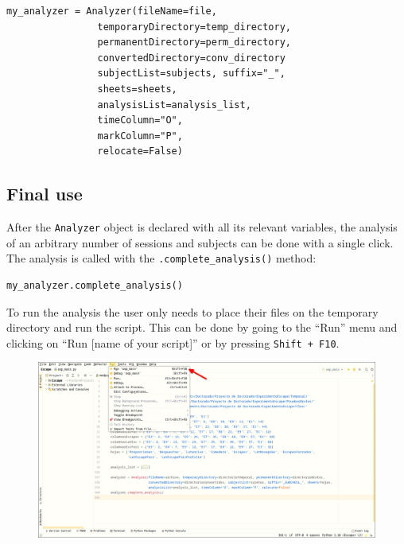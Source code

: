 \documentclass[a4paper,12pt]{article}
\begin{document}
\begin{tcolorbox}[
    enhanced,
    attach boxed title to top left={xshift=6mm,yshift=-3mm},
    colback=lightgreen!20,
    colframe=lightgreen,
    colbacktitle=lightgreen,
    title=Python,
    fonttitle=\bfseries\color{black},
    boxed title style={size=small,colframe=lightgreen,sharp corners},
    sharp corners,
    ]
    \begin{verbatim}
my_analyzer = Analyzer(fileName=file,
                temporaryDirectory=temp_directory,
                permanentDirectory=perm_directory,
                convertedDirectory=conv_directory
                subjectList=subjects, suffix="_",
                sheets=sheets,
                analysisList=analysis_list,
                timeColumn="O",
                markColumn="P",
                relocate=False)
    \end{verbatim}
\end{tcolorbox}

\subsection{Final use}

After the \verb|Analyzer| object is declared with all its relevant variables, the analysis of an arbitrary number of sessions and subjects can be done with a single click.  The analysis is called with the \verb|.complete_analysis()| method:
\begin{tcolorbox}[
    enhanced,
    attach boxed title to top left={xshift=6mm,yshift=-3mm},
    colback=lightgreen!20,
    colframe=lightgreen,
    colbacktitle=lightgreen,
    title=Python,
    fonttitle=\bfseries\color{black},
    boxed title style={size=small,colframe=lightgreen,sharp corners},
    sharp corners,
    ]
    \begin{verbatim}
my_analyzer.complete_analysis()
    \end{verbatim}
\end{tcolorbox}

To run the analysis the user only needs to place their files on the temporary directory and run the script. This can be done by going to the ``Run'' menu and clicking on ``Run [name of your script]'' or by pressing \verb|Shift + F10|.

\begin{figure}[!ht]
    \begin{center}
        \includegraphics[scale=0.35]{pycharm-run.png}
    \end{center}
\end{figure}
\end{document}
